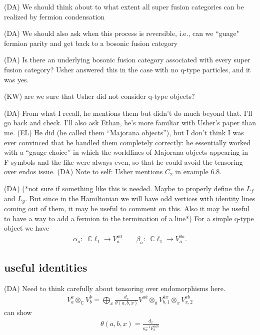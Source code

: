 \documentclass[12pt,a4paper]{article}
\newcounter{arrow}
\newcommand{\tp}{\otimes}
\newcommand{\dave}[1]{{\color{ao(english)}\footnotesize{(DA) #1}}}
\newcommand{\ethan}[1]{{\color{amethyst}\footnotesize{(EL) #1}}}
\newcommand{\kw}[1]{{\color{kwcolor}\footnotesize{(KW) #1}}}
\begin{document}
\dave{We should think about to what extent all super fusion categories can be realized by fermion condensation}

\dave{We should also ask when this process is reversible, i.e., can we ``guage" fermion parity and get back to a bosonic fusion category}

\dave{Is there an underlying bosonic fusion category associated with every super fusion category? Usher answered this in the case with no q-type particles, and it was yes.} 

\kw{are we sure that Usher did not consider q-type objects?}

\dave{From what I recall, he mentions them but didn't do much beyond that. I'll go back and check. I'll also ask Ethan, he's more familiar with Usher's paper than me.} \ethan{He did (he called them ``Majorana objects''), but I don't think I was ever convinced that he handled them completely correctly: he essentially worked with a ``gauge choice'' in which the worldlines of Majorana objects appearing in F-symbols and the like were always even, so that he could avoid the tensoring over endos issue.} \dave{Note to self: Usher mentions $C_2$ in example 6.8.}

\dave{(*not sure if something like this is needed. Maybe to properly define the $L_f$ and $L_g$. But since in the Hamiltonian we will have odd vertices with identity lines coming out of them, it may be useful to comment on this. Also it may be useful to have a way to add a fermion to the termination of a line*)
For a simple q-type object we have
\begin{align}
\alpha_a: \; \; \mathbb{C} \ell_1 \rightarrow V^{a 0 }_a \quad \quad \beta_a: \; \; \mathbb{C} \ell_1 \rightarrow V^{0a }_a.
\end{align}
}




\subsection{useful identities}

\dave{Need to think carefully about tensoring over endomorphisms here.}
\begin{align}
V^a_a \tp_{\mathbb{C}} V^b_b = \bigoplus_x \frac{d_x}{\theta(a,b,x)} V^{a \bar{a}} \tp_{\bar{a}}V^{\bar{a}x}_{b,1} \tp_x V^{ab}_{x,2}
\end{align}
can show
\begin{align}
\theta(a,b,x) = \frac{d_x}{\kappa_a^{-1} F^{\bar{a} a b}_b}
\end{align}
\end{document}
